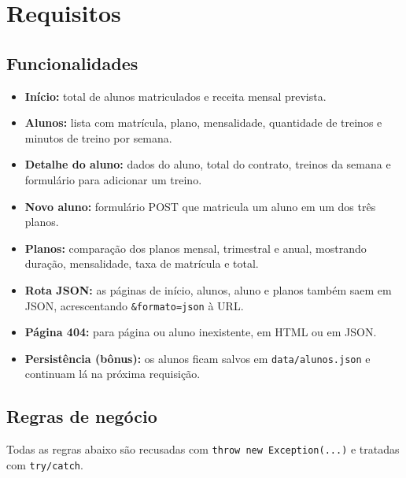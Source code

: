 \documentclass[12pt,a4paper]{article}
\begin{document}
\section{Requisitos}

\subsection{Funcionalidades}

\begin{itemize}
  \item \textbf{Início:} total de alunos matriculados e receita mensal prevista.
  \item \textbf{Alunos:} lista com matrícula, plano, mensalidade, quantidade de treinos e minutos de treino por semana.
  \item \textbf{Detalhe do aluno:} dados do aluno, total do contrato, treinos da semana e formulário para adicionar um treino.
  \item \textbf{Novo aluno:} formulário POST que matricula um aluno em um dos três planos.
  \item \textbf{Planos:} comparação dos planos mensal, trimestral e anual, mostrando duração, mensalidade, taxa de matrícula e total.
  \item \textbf{Rota JSON:} as páginas de início, alunos, aluno e planos também saem em JSON, acrescentando \texttt{\&formato=json} à URL.
  \item \textbf{Página 404:} para página ou aluno inexistente, em HTML ou em JSON.
  \item \textbf{Persistência (bônus):} os alunos ficam salvos em \texttt{data/alunos.json} e continuam lá na próxima requisição.
\end{itemize}

\subsection{Regras de negócio}

Todas as regras abaixo são recusadas com \texttt{throw new Exception(...)} e tratadas com \texttt{try/catch}.
\end{document}
